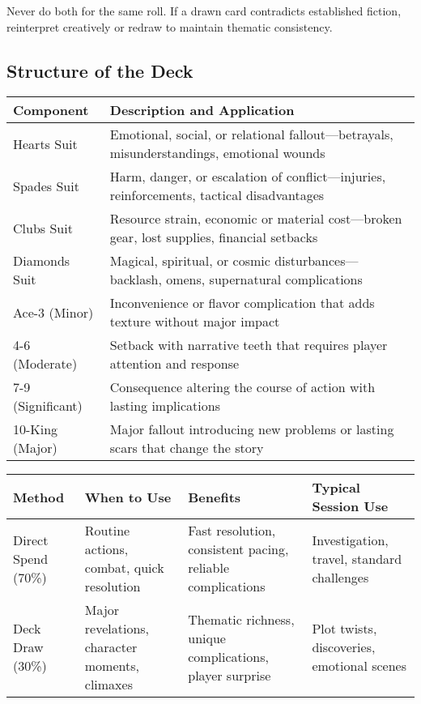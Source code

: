 Never do both for the same roll. If a drawn card contradicts established fiction, reinterpret creatively or redraw to maintain thematic consistency.

\subsection*{Structure of the Deck}

\begin{fatebox}
\begin{tabularx}{\textwidth}{lX}
\toprule
\textbf{Component} & \textbf{Description and Application} \\
\midrule
Hearts Suit & Emotional, social, or relational fallout---betrayals, misunderstandings, emotional wounds \\
Spades Suit & Harm, danger, or escalation of conflict---injuries, reinforcements, tactical disadvantages \\
Clubs Suit & Resource strain, economic or material cost---broken gear, lost supplies, financial setbacks \\
Diamonds Suit & Magical, spiritual, or cosmic disturbances---backlash, omens, supernatural complications \\
Ace-3 (Minor) & Inconvenience or flavor complication that adds texture without major impact \\
4-6 (Moderate) & Setback with narrative teeth that requires player attention and response \\
7-9 (Significant) & Consequence altering the course of action with lasting implications \\
10-King (Major) & Major fallout introducing new problems or lasting scars that change the story \\
\bottomrule
\end{tabularx}
\end{fatebox}

\begin{fatebox}
\begin{tabularx}{\textwidth}{lXXX}
\toprule
\textbf{Method} & \textbf{When to Use} & \textbf{Benefits} & \textbf{Typical Session Use} \\
\midrule
Direct Spend (70\%) & Routine actions, combat, quick resolution & Fast resolution, consistent pacing, reliable complications & Investigation, travel, standard challenges \\
Deck Draw (30\%) & Major revelations, character moments, climaxes & Thematic richness, unique complications, player surprise & Plot twists, discoveries, emotional scenes \\
\bottomrule
\end{tabularx}
\end{fatebox}

